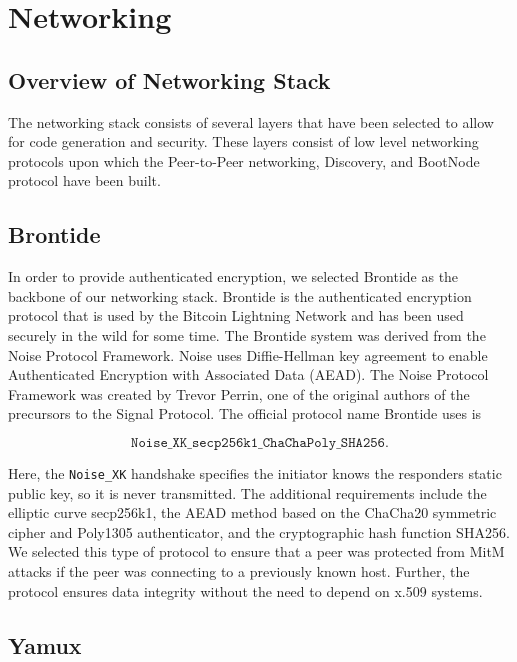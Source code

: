 \section{Networking}

\subsection{Overview of Networking Stack}

The networking stack consists of several layers that have been selected
to allow for code generation and security.
These layers consist of low level networking protocols upon which the
Peer-to-Peer networking, Discovery, and BootNode protocol have been built.

\subsection{Brontide}

In order to provide authenticated encryption, we selected Brontide as
the backbone of our networking stack.
Brontide is the authenticated encryption protocol that is used by the
Bitcoin Lightning Network and has been used securely in the wild for some time.
The Brontide system was derived from the Noise Protocol Framework.
Noise uses Diffie-Hellman key agreement to enable Authenticated
Encryption with Associated Data (AEAD).
The Noise Protocol Framework was created by Trevor Perrin, one of the
original authors of the precursors to the Signal Protocol.
The official protocol name Brontide uses is

\begin{equation*}
\texttt{Noise\_XK\_secp256k1\_ChaChaPoly\_SHA256}.
\end{equation*}

\noindent
Here, the \texttt{Noise\_XK} handshake specifies the initiator knows the
responders static public key, so it is never transmitted.
The additional requirements include the elliptic curve secp256k1, the
AEAD method based on the ChaCha20 symmetric cipher and Poly1305
authenticator, and the cryptographic hash function SHA256.
We selected this type of protocol to ensure that a peer was protected
from MitM attacks if the peer was connecting to a previously known host.
Further, the protocol ensures data integrity without the need to depend
on x.509 systems.

\subsection{Yamux}

